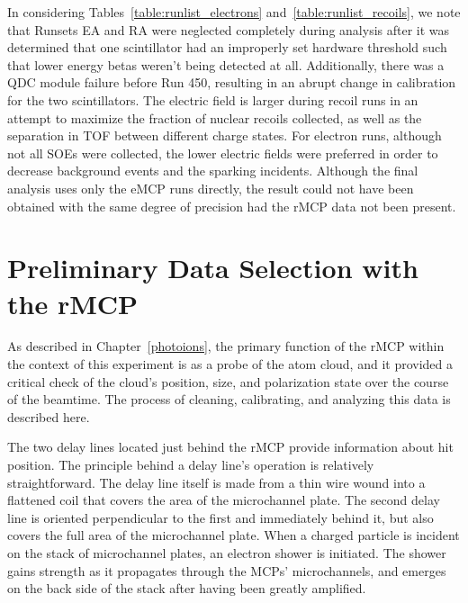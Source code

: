



In considering Tables~\ref{table:runlist_electrons} and~\ref{table:runlist_recoils}, we note that Runsets EA and RA were neglected completely during analysis after it was determined that one scintillator had an improperly set hardware threshold such that lower energy betas weren't being detected at all.  Additionally, there was a QDC module failure before Run 450, resulting in an abrupt change in calibration for the two scintillators.  The electric field is larger during recoil runs in an attempt to maximize the fraction of nuclear recoils collected, as well as the separation in \ac{TOF} between different charge states.  For electron runs, although not all SOEs were collected, the lower electric fields were preferred in order to decrease background events and the sparking incidents.   Although the final analysis uses only the eMCP runs directly, the result could not have been obtained with the same degree of precision had the rMCP data not been present.  

\section{Preliminary Data Selection with the rMCP}
\label{sec:rmcp_cuts}
As described in Chapter~\ref{photoions}, the primary function of the rMCP within the context of this experiment is as a probe of the atom cloud, and it provided a critical check of the cloud's position, size, and polarization state over the course of the beamtime.  The process of cleaning, calibrating, and analyzing this data is described here.  

The two delay lines located just behind the rMCP provide information about hit position.  The principle behind a delay line's operation is relatively straightforward.  The delay line itself is made from a thin wire wound into a flattened coil that covers the area of the microchannel plate.  The second delay line is oriented perpendicular to the first and immediately behind it, but also covers the full area of the microchannel plate.  When a charged particle is incident on the stack of microchannel plates, an electron shower is initiated.  The shower gains strength as it propagates through the MCPs' microchannels, and emerges on the back side of the stack after having been greatly amplified.  

